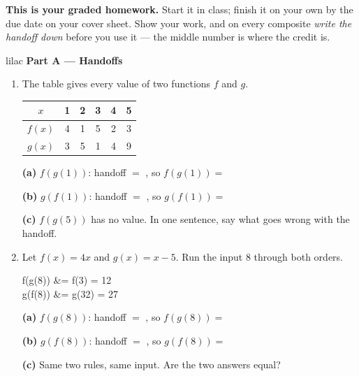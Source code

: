 \documentclass[10pt]{article}
\begin{document}

\vspace{0.1in}

\boxguard[8]
\begin{remindbox}
\small
\textbf{This is your graded homework.} Start it in class; finish it on your own by the due
date on your cover sheet. Show your work, and on every composite \emph{write the handoff down}
before you use it --- the middle number is where the credit is.
\end{remindbox}

\vspace{0.1in}

\begin{headlinebox}{lilac}
\textbf{\color{plum}Part A --- Handoffs}
\end{headlinebox}

\begin{enumerate}[leftmargin=1.9em, itemsep=8pt]

\item \begin{minipage}[t]{0.40\linewidth}
      \vspace{0pt}
      The table gives every value of two functions $f$ and $g$.
      \end{minipage}\hfill
      \begin{minipage}[t]{0.56\linewidth}
      \vspace{0pt}
      \centering
      {\renewcommand{\arraystretch}{1.3}
      \begin{tabular}{|c|c|c|c|c|c|}
      \hline
      $x$ & 1 & 2 & 3 & 4 & 5 \\ \hline
      $f(x)$ & 4 & 1 & 5 & 2 & 3 \\ \hline
      $g(x)$ & 3 & 5 & 1 & 4 & 9 \\ \hline
      \end{tabular}}
      \end{minipage}

      \textbf{(a)} $f(g(1))$: \; handoff $= $ \blank{1.4cm}, \; so $f(g(1)) = $ \blank{1.6cm}

      \textbf{(b)} $g(f(1))$: \; handoff $= $ \blank{1.4cm}, \; so $g(f(1)) = $ \blank{1.6cm}

      \textbf{(c)} $f(g(5))$ has no value. In one sentence, say what goes wrong with the handoff.
      \writespace{0.9cm}{}

\item Let $f(x) = 4x$ and $g(x) = x - 5$. Run the input 8 through both orders.

\begin{work}
  f(g(8)) &= f(3) = 12 \\
  g(f(8)) &= g(32) = 27
\end{work}

      \textbf{(a)} $f(g(8))$: \; handoff $= $ \blank{1.4cm}, \; so $f(g(8)) = $ \blank{1.6cm}

      \textbf{(b)} $g(f(8))$: \; handoff $= $ \blank{1.4cm}, \; so $g(f(8)) = $ \blank{1.6cm}

      \textbf{(c)} Same two rules, same input. Are the two answers equal? \blank{2.2cm}

\end{enumerate}
\end{document}
